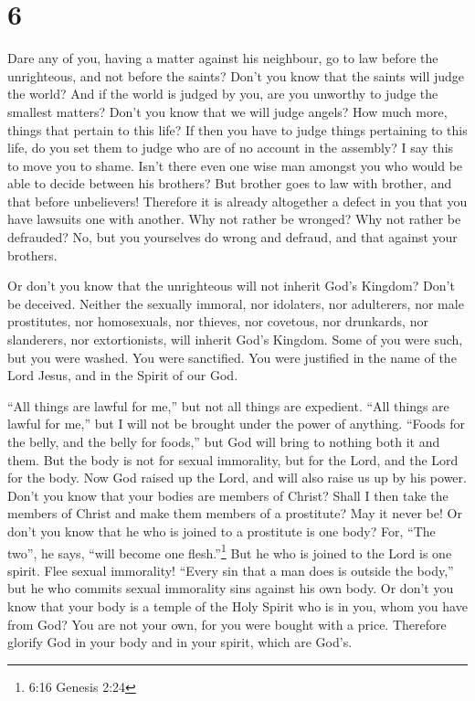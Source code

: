 \hypertarget{section-5}{%
\section{6}\label{section-5}}

 Dare any of you, having a matter against his neighbour, go
to law before the unrighteous, and not before the saints? 
Don't you know that the saints will judge the world? And if the world is
judged by you, are you unworthy to judge the smallest matters?
 Don't you know that we will judge angels? How much more,
things that pertain to this life?  If then you have to judge
things pertaining to this life, do you set them to judge who are of no
account in the assembly?  I say this to move you to shame.
Isn't there even one wise man amongst you who would be able to decide
between his brothers?  But brother goes to law with brother,
and that before unbelievers!  Therefore it is already
altogether a defect in you that you have lawsuits one with another. Why
not rather be wronged? Why not rather be defrauded?  No, but
you yourselves do wrong and defraud, and that against your brothers.

 Or don't you know that the unrighteous will not inherit
God's Kingdom? Don't be deceived. Neither the sexually immoral, nor
idolaters, nor adulterers, nor male prostitutes, nor homosexuals,
 nor thieves, nor covetous, nor drunkards, nor slanderers,
nor extortionists, will inherit God's Kingdom.  Some of you
were such, but you were washed. You were sanctified. You were justified
in the name of the Lord Jesus, and in the Spirit of our God.

 ``All things are lawful for me,'' but not all things are
expedient. ``All things are lawful for me,'' but I will not be brought
under the power of anything.  ``Foods for the belly, and
the belly for foods,'' but God will bring to nothing both it and them.
But the body is not for sexual immorality, but for the Lord, and the
Lord for the body.  Now God raised up the Lord, and will
also raise us up by his power.  Don't you know that your
bodies are members of Christ? Shall I then take the members of Christ
and make them members of a prostitute? May it never be!  Or
don't you know that he who is joined to a prostitute is one body? For,
``The two'', he says, ``will become one flesh.''\footnote{6:16 Genesis
  2:24}  But he who is joined to the Lord is one spirit.
 Flee sexual immorality! ``Every sin that a man does is
outside the body,'' but he who commits sexual immorality sins against
his own body.  Or don't you know that your body is a temple
of the Holy Spirit who is in you, whom you have from God? You are not
your own,  for you were bought with a price. Therefore
glorify God in your body and in your spirit, which are God's.

